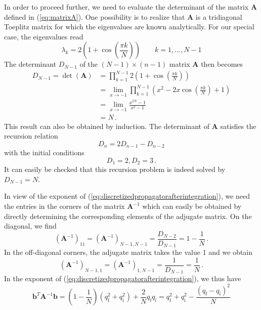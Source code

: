\documentclass[11pt,DIV=19,parskip=half]{scrartcl}
\begin{document}
In order to proceed further, we need to evaluate the determinant of the matrix $\mathbf{A}$ defined in
(\ref{eq:matrixA}). One possibility is to realize that $\mathbf{A}$ is a tridiagonal Toeplitz matrix
for which the eigenvalues are known analytically. For our special case, the eigenvalues read
\begin{equation}
 \lambda_k = 2\left(1+\cos\left(\frac{\pi k}{N}\right)\right)\qquad k=1,\ldots, N-1
\end{equation}
The determinant $D_{N-1}$ of the $(N-1)\times(n-1)$ matrix $\mathbf{A}$ then becomes
\begin{equation}
 \label{eq:determinantA}
 \begin{aligned}
  D_{N-1} = \det(\mathbf{A}) &= \prod_{k=1}^{N-1}2\left(1+\cos\left(\frac{\pi k}{N}\right)\right)\\
                             &= \lim_{x\to -1}\prod_{k=1}^{N-1}\left(x^2-2x\cos\left(\frac{\pi k}{N}\right)
                                                                     +1\right)\\
                             &= \lim_{x\to -1}\frac{x^{2N}-1}{x^2-1}\\
                             &= N\,.
 \end{aligned}
\end{equation}
This result can also be obtained by induction. The determinant of $\mathbf{A}$ satisfies
the recursion relation
\begin{equation}
 D_n = 2D_{n-1}-D_{n-2}
\end{equation}
with the initial conditions
\begin{equation}
 D_1 = 2, D_2 = 3\,.
\end{equation}
It can easily be checked that this recursion problem is indeed solved by $D_{N-1}=N$.

In view of the exponent of (\ref{eq:discretizedpropagatorafterintegration}), we need the
entries in the corners of the matrix $\mathbf{A}^{-1}$ which can easily be obtained by
directly determining the corresponding elements of the adjugate matrix. On the diagonal, we find
\begin{equation}
 (\mathbf{A}^{-1})_{11} = (\mathbf{A}^{-1})_{N-1,N-1} = \frac{D_{N-2}}{D_{N-1}} = 1-\frac{1}{N}\,.
\end{equation}
In the off-diagonal corners, the adjugate matrix takes the value 1 and we obtain
\begin{equation}
 (\mathbf{A}^{-1})_{N-1,1} = (\mathbf{A}^{-1})_{1,N-1} = \frac{1}{D_{N-1}} = \frac{1}{N}\,.
\end{equation}
In the exponent of (\ref{eq:discretizedpropagatorafterintegration}), we thus have
\begin{equation}
 \mathbf{b}^T\mathbf{A}^{-1}\mathbf{b} = \left(1-\frac{1}{N}\right)(q_\text{f}^2+q_\text{i}^2)
                                         +\frac{2}{N}q_\text{f}q_\text{i}
   = q_\text{f}^2+q_\text{i}^2 - \frac{(q_\text{f}-q_\text{i})^2}{N}
\end{equation}
\end{document}
